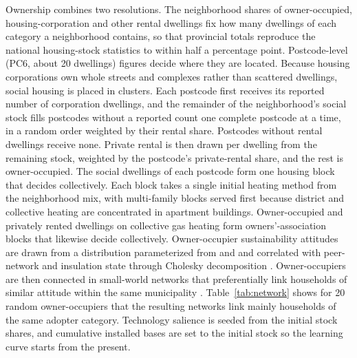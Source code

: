 \documentclass[preprint,12pt,authoryear]{elsarticle}
\begin{document}
Ownership combines two resolutions. The neighborhood shares of
owner-occupied, housing-corporation and other rental dwellings
\citep{cbsKerncijfersWijkenBuurten2023} fix how many dwellings of each
category a neighborhood contains, so that provincial totals reproduce the
national housing-stock statistics \citep{cbsVoorraadWoningenEigendom2025} to
within half a percentage point. Postcode-level (PC6, about 20 dwellings)
figures \citep{cbsKerncijfersPostcode2023} decide where they are located.
Because housing corporations own whole streets and complexes rather than
scattered dwellings, social housing is placed in clusters. Each postcode
first receives its reported number of corporation dwellings, and the
remainder of the neighborhood's social stock fills postcodes without a
reported count one complete postcode at a time, in a random order weighted by
their rental share. Postcodes without rental dwellings receive none. Private
rental is then drawn per dwelling from the remaining stock, weighted by the
postcode's private-rental share, and the rest is owner-occupied. The social
dwellings of each postcode form one housing block that decides collectively.
Each block takes a single initial heating method from the neighborhood mix,
with multi-family blocks served first because district and collective heating
are concentrated in apartment buildings. Owner-occupied and privately rented
dwellings on collective gas heating form owners'-association blocks that
likewise decide collectively. Owner-occupier sustainability attitudes are
drawn from a distribution parameterized from
\citet{okurAdoptionRenewableHeating2024} and
\citet{broersDecidedDividedEmpirical2019} and correlated with peer-network
and insulation state through Cholesky decomposition
\citep{edlinCorrelatedParametersCholesky2015}. Owner-occupiers are then
connected in small-world networks that preferentially link households of
similar attitude within the same municipality \citep{loomansQuantifyingPotentialEnergy2026}.
Table~\ref{tab:network} shows for 20 random owner-occupiers that the
resulting networks link mainly households of the same adopter category.
Technology salience is seeded
from the initial stock shares, and cumulative installed bases are set to the
initial stock so the learning curve starts from the present.
\end{document}
